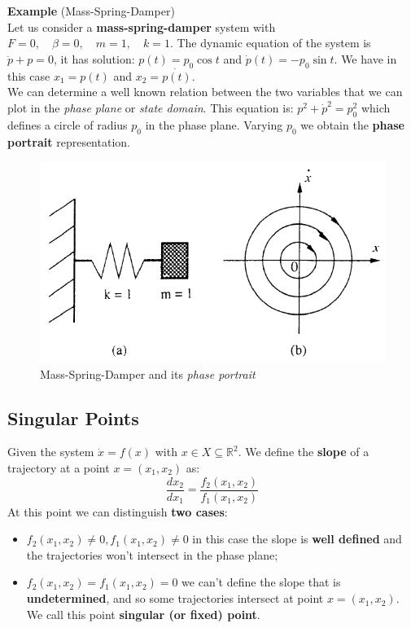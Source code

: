 \noindent
\textbf{Example} (Mass-Spring-Damper)\\
Let us consider a \textbf{mass-spring-damper} system with $F=0, \quad \beta=0,\quad m=1,\quad k=1$. The dynamic equation of the system is $\ddot{p}+p=0$, it has solution: $p(t)=p_0 \cos t$ and $\dot{p}(t)=-p_0 \sin t$. We have in this case $x_1=p(t)$ and $x_2=\dot{p(t)}$. \\
We can determine a well known relation between the two variables that we can plot in the \textit{phase plane} or \textit{state domain}. This equation is: $p^2+\dot{p}^2=p_0^2$ which defines a circle of radius $p_0$ in the phase plane. Varying $p_0$ we obtain the \textbf{phase portrait} representation.

\begin{figure}[h]
    \centering
    \includegraphics[scale=0.7]{NonLinearControl/images/PhasePort_MSD.png}
    \caption{Mass-Spring-Damper and its \textit{phase portrait}}
    \label{fig:enter-label}
\end{figure}

\subsection{Singular Points} 
Given the system $\dot{x}=f(x)$ with $x \in X \subseteq \mathbb{R}^2$. We define the \textbf{slope} of a trajectory at a point $x=(x_1, x_2)$ as: $$\frac{dx_2}{dx_1}=\frac{f_2(x_1, x_2)}{f_1(x_1, x_2)}$$
At this point we can distinguish \textbf{two cases}: 
\begin{itemize}
    \item $f_2(x_1, x_2)\ne 0, f_1(x_1, x_2)\ne 0$ in this case the slope is \textbf{well defined} and the trajectories won't intersect in the phase plane; 
    \item $f_2(x_1, x_2)=f_1(x_1, x_2)=0$ we can't define the slope that is \textbf{undetermined}, and so some trajectories intersect at point $x=(x_1, x_2)$. We call this point \textbf{singular (or fixed) point}.
\end{itemize}

